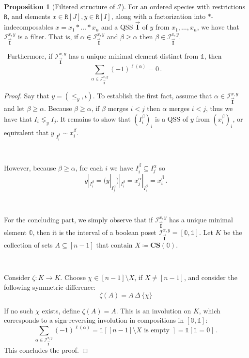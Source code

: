 \documentclass[12pt, reqno]{amsart}
\theoremstyle{definition}
\newtheorem{prop}[thm]{Proposition}
\newcommand{\III}{\vec{\mathbf{I}}}
\begin{document}
\begin{prop}[Filtered structure of $\mathcal I$]\label{prop:filter_structure_I}
For an ordered species with restrictions $\mathtt{R}$, and elements $x\in  \mathtt{R}[J], y\in \mathtt{R}[I]$, along with a factorization into $\ast$-indecomposables $x = x_1 \ast \dots \ast x_n$ and a QSS $\III$ of $y$ from $x_1, \dots, x_n$, we have that $\mathcal I^{ x, y}_{\III}$ is a filter.
That is, if $\alpha \in \mathcal I^{ x, y}_{\III}$ and $\beta \geq \alpha$ then $\beta \in \mathcal I^{ x, y}_{\III}$.

\
Furthermore, if $\mathcal I^{ x, y}_{\III}$ has a unique minimal element distinct from $\mathbb{1}$, then
$$\sum_{\alpha \in \mathcal I^{x, y}_{\III}} (-1)^{\ell(\alpha)} = 0 \, .$$
\end{prop}

\begin{proof}
Say that $y = (\leq_y, \iota)$.
To establish the first fact, assume that $\alpha \in \mathcal I^{x, y}_{\III}$ and let $\beta \geq \alpha $.
Because $\beta \geq \alpha$, if $\beta $ merges $i < j$ then $\alpha $ merges $i < j$, thus we have that $I_i \lneq_y I_j$.
It remains to show that $(I^{\beta}_i)_i$ is a QSS of $y$ from $(x^{\beta}_i )_i$, or equivalent that $y|_{I_i^{\beta}} \sim x_i^{\beta}$.

\

However, because $\beta \geq \alpha$, for each $i$ we have $I^{\beta}_i \subseteq I^{\alpha}_j$ so 
\[y|_{I^{\beta}_i} = {\Big(}y|_{I^{\alpha}_j}{\Big )}|_{I^{\beta}_i} =x^{\alpha}_j |_{I^{\beta}_i} = x^{\beta}_i \, .\]

\

For the concluding part, we simply observe that if $\mathcal I^{x, y}_{\III}$ has a unique minimal element $\mathbb{0}$, then it is the interval of a boolean poset $\mathcal I^{x, y}_{\III} = [\mathbb{0}, \mathbb{1}]$.
Let $K $ be the collection of sets $A \subseteq [n-1]$ that contain $X \coloneqq \mathbf{CS}(\mathbb{0})$.

\

Consider $\zeta: K \to K$.
Choose $\chi \in [n-1] \setminus X$, if $X \neq [n-1]$, and consider the following symmetric difference:
\[\zeta (A) = A \,\Delta\, \{ \chi \}\]

If no such $\chi $ exists, define $\zeta(A) = A$.
This is an involution on $K$, %
which corresponds to a sign-reversing involution in compositions in $[\mathbb{0} , \mathbb{1}]$:
$$\sum_{\alpha \in \mathcal I^{x, y}_{\III}} (-1)^{\ell(\alpha)} =  \mathbb{1}[[n-1] \setminus X \text{ is empty } ] = \mathbb{1}[\mathbb{1} = \mathbb{0}] \, .$$
This concludes the proof.
\end{proof}
\end{document}
